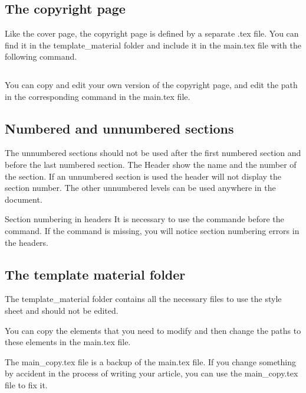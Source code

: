\documentclass[Theme1]{{template_material/eurostat}}
\begin{document}
\subsection{The copyright page}

Like the cover page, the copyright page is defined by a separate .tex file. You can find it in the template\_material folder and include it in the main.tex file with the following command. 
\begin{verbatim}

\end{verbatim}

You can copy and edit your own version of the copyright page, and edit the path in the corresponding  command in the main.tex file. 


\subsection{Numbered and unnumbered sections}

The unnumbered sections should not be used after the first numbered section and before the last numbered section. The Header show the name and the number of the section. If an unnumbered section is used the header will not display the section number. The other unnumbered levels can be used anywhere in the document.

\begin{boxe3}{Section numbering in headers}
    It is necessary to use the  commande before the  command. If the  command is missing, you will notice section numbering errors in the headers.
\end{boxe3}

\subsection{The template material folder}

The template\_material folder contains all the necessary files to use the style sheet and should not be edited. 

You can copy the elements that you need to modify and then change the paths to these elements in the main.tex file.

The main\_copy.tex file is a backup of the main.tex file. If you change something by accident in the process of writing your article, you can use the main\_copy.tex file to fix it. 

\newpage %
\end{document}
